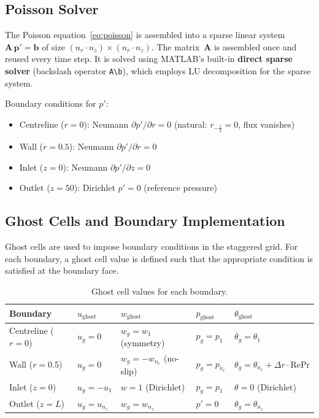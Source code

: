 \documentclass[12pt,a4paper]{article}
\newcommand{\Rey}{\text{Re}}
\newcommand{\Pran}{\text{Pr}}
\begin{document}
\subsection{Poisson Solver}

The Poisson equation~\eqref{eq:poisson} is assembled into a sparse linear system $\mathbf{A}\,\mathbf{p}' = \mathbf{b}$ of size $(n_r \cdot n_z) \times (n_r \cdot n_z)$.
The matrix~$\mathbf{A}$ is assembled once and reused every time step.
It is solved using MATLAB's built-in \textbf{direct sparse solver} (backslash operator \texttt{A\textbackslash b}), which employs LU decomposition for the sparse system.

Boundary conditions for $p'$:
\begin{itemize}
    \item Centreline ($r=0$): Neumann $\partial p'/\partial r = 0$ (natural: $r_{-\frac{1}{2}} = 0$, flux vanishes)
    \item Wall ($r=0.5$): Neumann $\partial p'/\partial r = 0$
    \item Inlet ($z=0$): Neumann $\partial p'/\partial z = 0$
    \item Outlet ($z=50$): Dirichlet $p' = 0$ (reference pressure)
\end{itemize}

\subsection{Ghost Cells and Boundary Implementation}

Ghost cells are used to impose boundary conditions in the staggered grid.
For each boundary, a ghost cell value is defined such that the appropriate condition is satisfied at the boundary face.

\begin{table}[H]
\centering
\caption{Ghost cell values for each boundary.}
\label{tab:ghost}
\begin{tabular}{lllll}
\toprule
\textbf{Boundary} & $u_{\text{ghost}}$ & $w_{\text{ghost}}$ & $p_{\text{ghost}}$ & $\theta_{\text{ghost}}$ \\
\midrule
Centreline ($r=0$) & $u_g = 0$ & $w_g = w_1$ (symmetry) & $p_g = p_1$ & $\theta_g = \theta_1$ \\
Wall ($r=0.5$) & $u_g = 0$ & $w_g = -w_{n_r}$ (no-slip) & $p_g = p_{n_r}$ & $\theta_g = \theta_{n_r} + \Delta r\cdot\Rey\Pran$ \\
Inlet ($z=0$) & $u_g = -u_1$ & $w = 1$ (Dirichlet) & $p_g = p_1$ & $\theta = 0$ (Dirichlet) \\
Outlet ($z=L$) & $u_g = u_{n_z}$ & $w_g = w_{n_z}$ & $p' = 0$ & $\theta_g = \theta_{n_z}$ \\
\bottomrule
\end{tabular}
\end{table}
\end{document}
